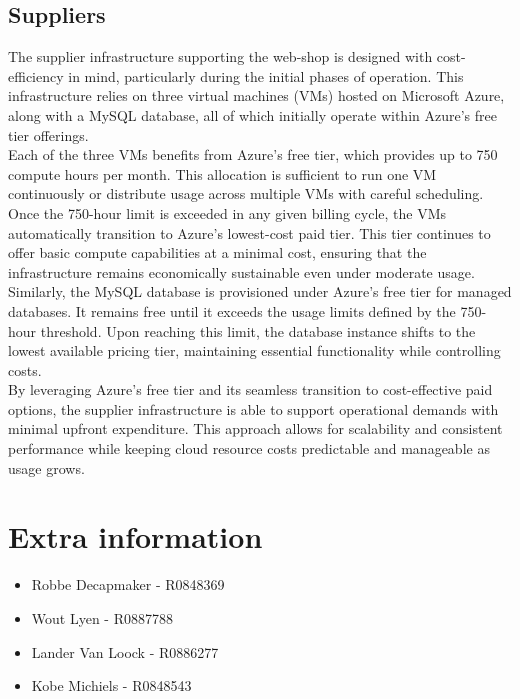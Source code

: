 \documentclass[10pt,a4paper,kul]{kulakarticle} %
\begin{document}
		\subsection{Suppliers}
			The supplier infrastructure supporting the web-shop is designed with cost-efficiency in mind, particularly during the initial phases of operation. This infrastructure relies on three virtual machines (VMs) hosted on Microsoft Azure, along with a MySQL database, all of which initially operate within Azure's free tier offerings.\\
			Each of the three VMs benefits from Azure’s free tier, which provides up to 750 compute hours per month. This allocation is sufficient to run one VM continuously or distribute usage across multiple VMs with careful scheduling. Once the 750-hour limit is exceeded in any given billing cycle, the VMs automatically transition to Azure’s lowest-cost paid tier. This tier continues to offer basic compute capabilities at a minimal cost, ensuring that the infrastructure remains economically sustainable even under moderate usage.\\
			Similarly, the MySQL database is provisioned under Azure’s free tier for managed databases. It remains free until it exceeds the usage limits defined by the 750-hour threshold. Upon reaching this limit, the database instance shifts to the lowest available pricing tier, maintaining essential functionality while controlling costs.\\
			By leveraging Azure’s free tier and its seamless transition to cost-effective paid options, the supplier infrastructure is able to support operational demands with minimal upfront expenditure. This approach allows for scalability and consistent performance while keeping cloud resource costs predictable and manageable as usage grows.
	
\newpage
  \section{Extra information}
  \begin{itemize}
    \item Robbe Decapmaker - R0848369
    \item Wout Lyen - R0887788
    \item Lander Van Loock - R0886277
    \item Kobe Michiels - R0848543
  \end{itemize}
  
\end{document}
